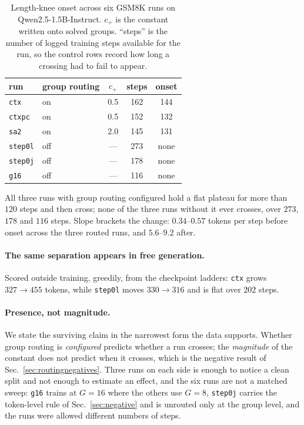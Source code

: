 \begin{table}[t]
\centering\small
\caption{Length-knee onset across six GSM8K runs on Qwen2.5-1.5B-Instruct. $c_+$ is the
constant written onto solved groups. ``steps'' is the number of logged training steps
available for the run, so the control rows record how long a crossing had to fail to appear.}
\label{tab:knee}
\begin{tabular}{llccc}
\toprule
run & group routing & $c_+$ & steps & onset \\
\midrule
\texttt{ctx}    & on  & 0.5 & 162 & 144 \\
\texttt{ctxpc}  & on  & 0.5 & 152 & 132 \\
\texttt{sa2}    & on  & 2.0 & 145 & 131 \\
\midrule
\texttt{step0l} & off & --- & 273 & none \\
\texttt{step0j} & off & --- & 178 & none \\
\texttt{g16}    & off & --- & 116 & none \\
\bottomrule
\end{tabular}
\end{table}

All three runs with group routing configured hold a flat plateau for more than $120$ steps and
then cross; none of the three runs without it ever crosses, over $273$, $178$ and $116$ steps.
Slope brackets the change: $0.34$--$0.57$ tokens per step before onset across the three routed
runs, and $5.6$--$9.2$ after.

\paragraph{The same separation appears in free generation.} Scored outside training, greedily,
from the checkpoint ladders: \texttt{ctx} grows $327 \to 455$ tokens, while \texttt{step0l}
moves $330 \to 316$ and is flat over $202$ steps.

\paragraph{Presence, not magnitude.} We state the surviving claim in the narrowest form the
data supports. Whether group routing is \emph{configured} predicts whether a run crosses; the
\emph{magnitude} of the constant does not predict when it crosses, which is the negative
result of Sec.~\ref{sec:routingnegatives}. Three runs on each side is enough to notice a clean
split and not enough to estimate an effect, and the six runs are not a matched sweep:
\texttt{g16} trains at $G=16$ where the others use $G=8$, \texttt{step0j} carries the
token-level rule of Sec.~\ref{sec:negative} and is unrouted only at the group level, and the
runs were allowed different numbers of steps.

